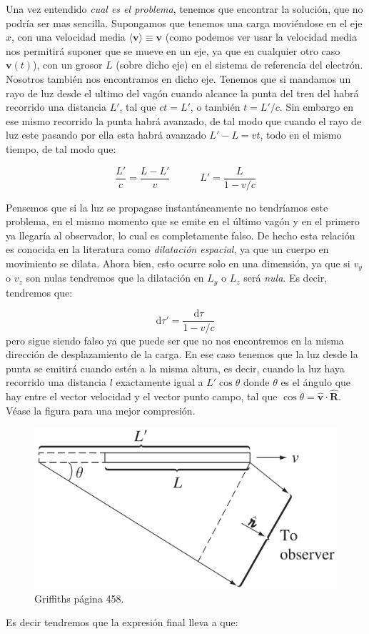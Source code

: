 \documentclass[12pt,a4paper]{article}
\newcommand{\D}{\mathrm{d}}
\newcommand{\tquad}{\quad \quad \quad}
\newcommand{\vn}{\mathbf{v}}
\newcommand{\hnR}{\hat{\mathbf{R}}}
\newcommand{\hnv}{\hat{\mathbf{v}}}
\numberwithin{equation}{section}
\numberwithin{figure}{section}
\begin{document}
Una vez entendido \textit{cual es el problema}, tenemos que encontrar la solución, que no podría ser mas sencilla. Supongamos que tenemos una carga moviéndose en el eje $x$, con una velocidad media $\langle \vn \rangle \equiv \vn$ (como podemos ver usar la velocidad media nos permitirá suponer que se mueve en un eje, ya que en cualquier otro caso $\vn(t)$), con un grosor $L$ (sobre dicho eje) en el sistema de referencia del electrón. Nosotros también nos encontramos en dicho eje. Tenemos que si mandamos un rayo de luz desde el ultimo del vagón cuando alcance la punta del tren del habrá recorrido una distancia $L'$, tal que $c t = L'$, o también $t = L'/c$. Sin embargo en ese mismo recorrido la punta habrá avanzado, de tal modo que cuando el rayo de luz este pasando por ella esta habrá avanzado $L'-L=v t$, todo en el mismo tiempo, de tal modo que:

\begin{equation}
\dfrac{L'}{c} = \dfrac{L-L'}{v}  \tquad L'= \dfrac{L}{1-v/c}
\end{equation} 

Pensemos que si la luz se propagase instantáneamente no tendríamos este problema, en el mismo momento que se emite en el último vagón y en el primero ya llegaría al observador, lo cual es completamente falso. De hecho esta relación es conocida en la literatura como \textit{dilatación espacial}, ya que un cuerpo en movimiento se dilata. Ahora bien, esto ocurre solo en una dimensión, ya que si $v_y$ o $v_z$ son nulas tendremos que la dilatación en $L_y$ o $L_z$ será \textit{nula}. Es decir, tendremos que:

$$  \D \tau' = \dfrac{\D \tau}{1 - v/c} $$
pero sigue siendo falso ya que puede ser que no nos encontremos en la misma dirección de desplazamiento de la carga. En ese caso tenemos que la luz desde la punta se emitirá cuando estén a la misma altura, es decir, cuando la luz haya recorrido una distancia $l$ exactamente igual a $L' \cos \theta$ donde $\theta$ es el ángulo que hay entre el vector velocidad y el vector punto campo, tal que $\cos \theta = \hnv \cdot \hnR$. Véase la figura para una mejor compresión.

\begin{figure}[h!] \centering
\includegraphics[scale=0.22]{lienard.png}
\caption{Griffiths página 458.}
\end{figure}
Es decir tendremos que la expresión final lleva a que:
\end{document}

